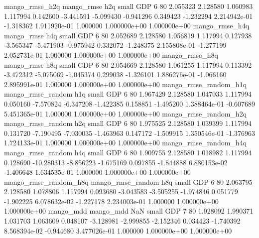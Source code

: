        mango_rmse_h2q        mango_rmse                  h2q      small      GDP                 6 80 2.055323       2.128580 1.060983       1.117994    0.142600     -3.441591     -5.099430    -0.941296       0.349423 -1.232294 2.214942e-01    -1.318362   1.911920e-01            1.000000    1.000000e+00        1.000000e+00
       mango_rmse_h4q        mango_rmse                  h4q      small      GDP                 6 80 2.052689       2.128580 1.056819       1.117994    0.127938     -3.565347     -5.471903    -0.975942       0.332072 -1.248375 2.155808e-01    -1.277199   2.052731e-01            1.000000    1.000000e+00        1.000000e+00
       mango_rmse_h8q        mango_rmse                  h8q      small      GDP                 6 80 2.054669       2.128580 1.061255       1.117994    0.113392     -3.472312     -5.075069    -1.045374       0.299038 -1.326101 1.886276e-01    -1.066160   2.895991e-01            1.000000    1.000000e+00        1.000000e+00
mango_rmse_random_h1q mango_rmse_random                  h1q      small      GDP                 6 80 1.967429       2.128580 1.047033       1.117994    0.050160     -7.570824     -6.347208    -1.422385       0.158851 -1.495200 1.388464e-01    -0.607689   5.451365e-01            1.000000    1.000000e+00        1.000000e+00
mango_rmse_random_h2q mango_rmse_random                  h2q      small      GDP                 6 80 1.975525       2.128580 1.039399       1.117994    0.131720     -7.190495     -7.030035    -1.463963       0.147172 -1.509915 1.350546e-01    -1.376963   1.724133e-01            1.000000    1.000000e+00        1.000000e+00
mango_rmse_random_h4q mango_rmse_random                  h4q      small      GDP                 6 80 1.909755       2.128580 1.018982       1.117994    0.128690    -10.280313     -8.856223    -1.675169       0.097855 -1.844888 6.880153e-02    -1.406648   1.634535e-01            1.000000    1.000000e+00        1.000000e+00
mango_rmse_random_h8q mango_rmse_random                  h8q      small      GDP                 6 80 2.063795       2.128580 1.078806       1.117994    0.093680     -3.043583     -3.505255    -1.974846       0.051779 -1.902225 6.078632e-02    -1.227178   2.234003e-01            1.000000    1.000000e+00        1.000000e+00
            mango_mdd         mango_mdd                  NaN      small      GDP                 7 80 1.928092       1.990371 1.031703       1.063609    0.048107     -3.128981     -2.999855    -2.152346       0.034423 -1.740392 8.568394e-02    -0.944680   3.477026e-01            1.000000    1.000000e+00        1.000000e+00
